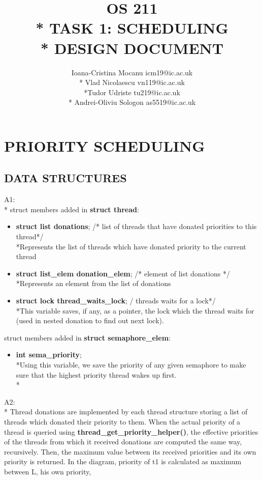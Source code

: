 \documentclass{article}
\title{          \textbf{
                        OS 211        \\*
                    TASK 1: SCHEDULING  \\*
                    DESIGN DOCUMENT }}
\author{Ioana-Cristina Mocanu icm19@ic.ac.uk\\* Vlad Nicolaescu vn119@ic.ac.uk\\*Tudor Udriste tu219@ic.ac.uk\\* Andrei-Oliviu Sologon as5519@ic.ac.uk}
\begin{document}
\maketitle

\section*{PRIORITY SCHEDULING}

\subsection*{DATA STRUCTURES}
\justify

A1:\\*
struct members added in \textbf{struct thread}:
\begin{itemize}
\item \textbf{struct list donations};							/* list of threads that have donated priorities to this thread*/
\\*Represents the list of threads which have donated priority to the current thread
\item \textbf{struct list\_elem donation\_elem};      /* element of list donations */
\\*Represents an element from the list of donations
\item \textbf{struct lock thread\_waits\_lock};				/ threads waits for a lock*/
\\*This variable saves, if any, as a pointer, the lock which the thread waits for (used in nested donation to find out next lock).
\end{itemize}
struct members added in \textbf{struct semaphore\_elem}:
\begin{itemize}
\item \textbf{int sema\_priority};
\\*Using this variable, we save the priority of any given semaphore to make sure that the highest priority thread wakes up first.\\*
\end{itemize}
A2:\\*
  Thread donations are implemented by each thread structure storing a list of
threads which donated their priority to them. When the actual priority of a thread
is queried using \textbf{thread\_get\_priority\_helper()}, the effective priorities of the threads
from which it received donations are computed the same way, recursively. Then, the
maximum value between its received priorities and its own priority is returned.
  In the diagram, priority of t1 is calculated as maximum between L, his own priority,
\end{document}

